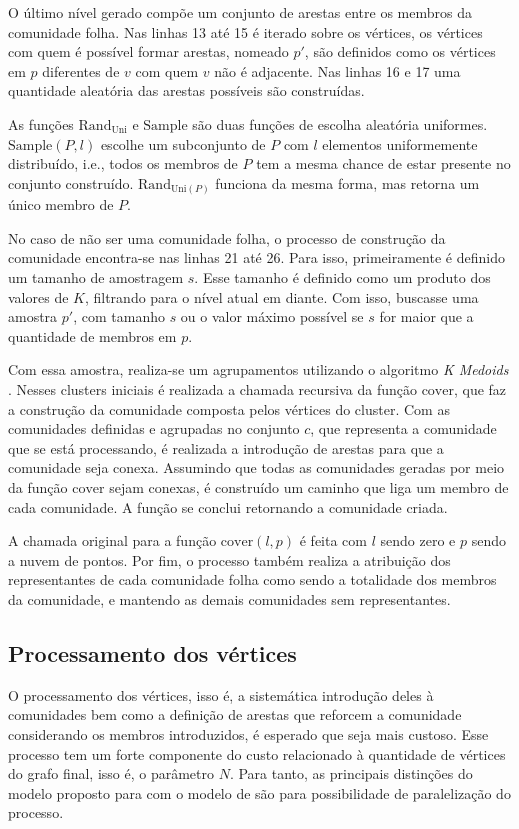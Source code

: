 \documentclass[notes.tex]{subfiles}
\begin{document}
O último nível gerado compõe um conjunto de arestas entre os membros da comunidade folha.
Nas linhas 13 até 15 é iterado sobre os vértices, os vértices com quem é possível formar arestas, nomeado $p'$, são definidos como os vértices em $p$ diferentes de $v$ com quem $v$ não é adjacente.
Nas linhas 16 e 17 uma quantidade aleatória das arestas possíveis são construídas.

As funções $\text{Rand}_{\text{Uni}}$ e $\text{Sample}$ são duas funções de escolha aleatória uniformes.
$\text{Sample}(P, l)$ escolhe um subconjunto de $P$ com $l$ elementos uniformemente distribuído, i.e., todos os membros de $P$ tem a mesma chance de estar presente no conjunto construído.
$\text{Rand}_{\text{Uni}(P)}$ funciona da mesma forma, mas retorna um único membro de $P$.

No caso de não ser uma comunidade folha, o processo de construção da comunidade encontra-se nas linhas 21 até 26.
Para isso, primeiramente é definido um tamanho de amostragem $s$.
Esse tamanho é definido como um produto dos valores de $K$, filtrando para o nível atual em diante.
Com isso, buscasse uma amostra $p'$, com tamanho  $s$ ou o valor máximo possível se  $s$ for maior que a quantidade de membros em  $p$.

Com essa amostra, realiza-se um agrupamentos utilizando o algoritmo \emph{K Medoids} \cite{largeron2015generating}.
Nesses clusters iniciais é realizada a chamada recursiva da função $\text{cover}$, que faz a construção da comunidade composta pelos vértices do cluster.
Com as comunidades definidas e agrupadas no conjunto $c$, que representa a comunidade que se está processando, é realizada a introdução de arestas para que a comunidade seja conexa.
Assumindo que todas as comunidades geradas por meio da função  $\text{cover}$ sejam conexas, é construído um caminho que liga um membro de cada comunidade.
A função se conclui retornando a comunidade criada.

A chamada original para a função $\text{cover}(l, p)$ é feita com $l$ sendo zero e  $p$ sendo a nuvem de pontos.
Por fim, o processo também realiza a atribuição dos representantes de cada comunidade folha como sendo a totalidade dos membros da comunidade, e mantendo as demais comunidades sem representantes.

\subsection{Processamento dos vértices}

O processamento dos vértices, isso é, a sistemática introdução deles à comunidades bem como a definição de arestas que reforcem a comunidade considerando os membros introduzidos, é esperado que seja mais custoso.
Esse processo tem um forte componente do custo relacionado à quantidade de vértices do grafo final, isso é, o parâmetro $N$.
Para tanto, as principais distinções do modelo proposto para com o modelo de  são para possibilidade de paralelização do processo.
\end{document}
